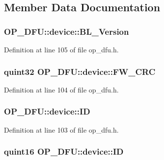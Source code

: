 \subsection{Member Data Documentation}
\hypertarget{struct_o_p___d_f_u_1_1device_ab89763014053b2de992a088ea6699c7e}{
\subsubsection[{B\-L\-\_\-\-Version}]{ O\-P\-\_\-\-D\-F\-U\-::device\-::\-B\-L\-\_\-\-Version}}\label{struct_o_p___d_f_u_1_1device_ab89763014053b2de992a088ea6699c7e}


Definition at line 105 of file op\-\_\-dfu.\-h.

\hypertarget{struct_o_p___d_f_u_1_1device_a9f0dfb2fe44c04290c45c907ef33b21d}{
\subsubsection[{F\-W\-\_\-\-C\-R\-C}]{\setlength{\rightskip}{0pt plus 5cm}quint32 O\-P\-\_\-\-D\-F\-U\-::device\-::\-F\-W\-\_\-\-C\-R\-C}}\label{struct_o_p___d_f_u_1_1device_a9f0dfb2fe44c04290c45c907ef33b21d}


Definition at line 104 of file op\-\_\-dfu.\-h.

\hypertarget{struct_o_p___d_f_u_1_1device_aa902f110c1dd44ab3decfbafdcfbb3db}{
\subsubsection[{I\-D}]{ O\-P\-\_\-\-D\-F\-U\-::device\-::\-I\-D}}\label{struct_o_p___d_f_u_1_1device_aa902f110c1dd44ab3decfbafdcfbb3db}


Definition at line 103 of file op\-\_\-dfu.\-h.

\hypertarget{struct_o_p___d_f_u_1_1device_afb3f2517289d989e75630f33abbc4685}{
\subsubsection[{I\-D}]{\setlength{\rightskip}{0pt plus 5cm}quint16 O\-P\-\_\-\-D\-F\-U\-::device\-::\-I\-D}}\label{struct_o_p___d_f_u_1_1device_afb3f2517289d989e75630f33abbc4685}


